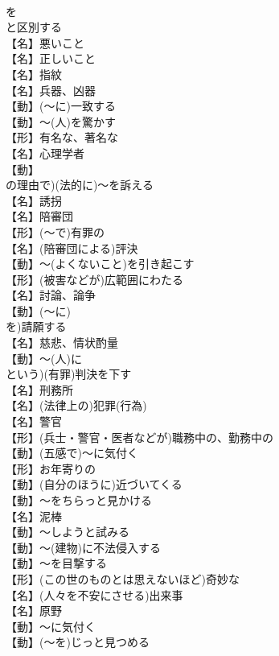 \documentclass[8pt]{extreport}
\begin{document}
\begin{CJK}{UTF8}{min}
\\	を
\\	と区別する
\\	【名】悪いこと
\\	【名】正しいこと
\\	【名】指紋
\\	【名】兵器、凶器
\\	【動】(～に)一致する
\\	【動】～(人)を驚かす
\\	【形】有名な、著名な
\\	【名】心理学者
\\	【動】
\\	の理由で)(法的に)～を訴える
\\	【名】誘拐
\\	【名】陪審団
\\	【形】(～で)有罪の
\\	【名】(陪審団による)評決
\\	【動】～(よくないこと)を引き起こす
\\	【形】(被害などが)広範囲にわたる
\\	【名】討論、論争
\\	【動】(～に)
\\	を)請願する
\\	【名】慈悲、情状酌量
\\	【動】～(人)に
\\	という)(有罪)判決を下す
\\	【名】刑務所
\\	【名】(法律上の)犯罪(行為)
\\	【名】警官
\\	【形】(兵士・警官・医者などが)職務中の、勤務中の
\\	【動】(五感で)～に気付く
\\	【形】お年寄りの
\\	【動】(自分のほうに)近づいてくる
\\	【動】～をちらっと見かける
\\	【名】泥棒
\\	【動】～しようと試みる
\\	【動】～(建物)に不法侵入する
\\	【動】～を目撃する
\\	【形】(この世のものとは思えないほど)奇妙な
\\	【名】(人々を不安にさせる)出来事
\\	【名】原野
\\	【動】～に気付く
\\	【動】(～を)じっと見つめる

\end{CJK}
\end{document}
